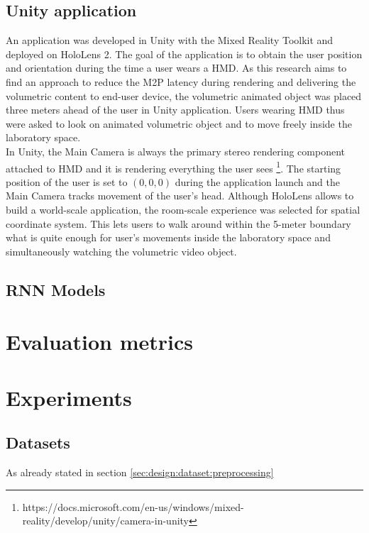 \subsection{Unity application}
\label{sec:imp:programming:unity}
An application was developed in Unity with the Mixed Reality Toolkit and deployed on HoloLens 2. The goal of the application is to obtain the user position and orientation during the time a user wears a HMD. As this research aims to find an approach to reduce the M2P latency during rendering and delivering the volumetric content to end-user device, the volumetric animated object was placed three meters ahead of the user in Unity application. Users wearing HMD thus were asked to look on animated volumetric object and to move freely inside the laboratory space.\\
In Unity, the Main Camera is always the primary stereo rendering component attached to HMD and it is rendering everything the user sees \footnote{https://docs.microsoft.com/en-us/windows/mixed-reality/develop/unity/camera-in-unity}. The starting position of the user is set to $(0, 0, 0)$ during the application launch and the Main Camera tracks movement of the user's head. Although HoloLens allows to build a world-scale application, the room-scale experience was selected for spatial coordinate system. This lets users to walk around within the 5-meter boundary what is quite enough for user's movements inside the laboratory space and simultaneously watching the volumetric video object. 

\subsection{RNN Models}
\label{sec:imp:programming:model}


\section{Evaluation metrics}
\label{sec:imp:eval}


\section{Experiments}
\label{sec:imp:experiments}

\subsection{Datasets}
\label{sec:imp:experiments:ds}
As already stated in section \ref{sec:design:dataset:preprocessing}

